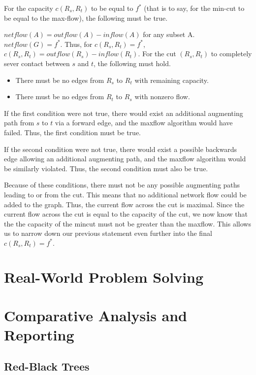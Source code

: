 \documentclass[12pt]{amsart}
\begin{document}
    For the capacity $c(R_s, R_t)$ to be equal to $f^*$ (that is
    to say, for the min-cut to be equal to the max-flow), the
    following must be true.

    $netflow(A) = outflow(A) - inflow(A)$ for any subset A.
    $netflow(G) = f^*$. Thus, for $c(R_s, R_t) = f^*$,
    $c(R_s, R_t) = outflow(R_s) - inflow(R_t)$. For the cut
    $(R_s, R_t)$ to completely sever contact between $s$ and
    $t$, the following must hold.

    \begin{itemize}
        \item There must be no edges from $R_s$ to $R_t$ with
            remaining capacity.
        \item There must be no edges from $R_t$ to $R_s$ with
            nonzero flow.
    \end{itemize}

    If the first condition were not true, there would exist an
    additional augmenting path from $s$ to $t$ via a forward
    edge, and the maxflow algorithm would have failed. Thus, the
    first condition must be true.

    If the second condition were not true, there would exist a
    possible backwards edge allowing an additional augmenting
    path, and the maxflow algorithm would be similarly violated.
    Thus, the second condition must also be true.

    Because of these conditions, there must not be any possible
    augmenting paths leading to or from the cut. This means that
    no additional network flow could be added to the graph.
    Thus, the current flow across the cut is maximal. Since the
    current flow across the cut is equal to the capacity of the
    cut, we now know that the the capacity of the mincut must
    not be greater than the maxflow. This allows us to narrow
    down our previous statement even further into the final
    $c(R_s, R_t) = f^*$.

\section{Real-World Problem Solving}


\section{Comparative Analysis and Reporting}

\subsection{Red-Black Trees}
\end{document}
